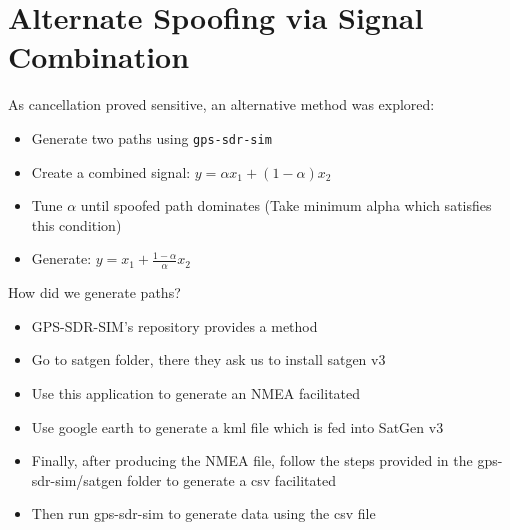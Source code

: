 \documentclass[12pt]{report}
\begin{document}
\section{Alternate Spoofing via Signal Combination}
As cancellation proved sensitive, an alternative method was explored:
\begin{itemize}
  \item Generate two paths using \texttt{gps-sdr-sim}
  \item Create a combined signal: \( y = \alpha x_1 + (1-\alpha)x_2 \)
  \item Tune $\alpha$ until spoofed path dominates (Take minimum alpha which satisfies this condition)
  \item Generate: \( y = x_1 + \frac{1-\alpha}{\alpha}x_2 \)
\end{itemize}

\noindent How did we generate paths?
\begin{itemize}
  \item GPS-SDR-SIM's repository provides a method
  \item Go to satgen folder, there they ask us to install satgen v3
  \item Use this application to generate an NMEA facilitated
  \item Use google earth to generate a kml file which is fed into SatGen v3
  \item Finally, after producing the NMEA file, follow the steps provided in the gps-sdr-sim/satgen folder to generate a csv facilitated
  \item Then run gps-sdr-sim to generate data using the csv file
\end{itemize}
\end{document}
